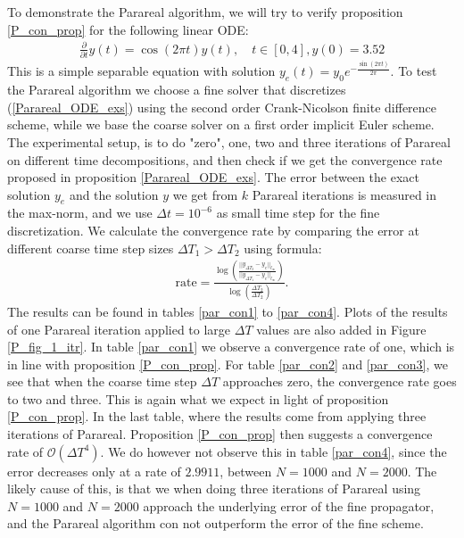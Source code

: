 \\
\\
To demonstrate the Parareal algorithm, we will try to verify proposition \ref{P_con_prop} for the following linear ODE:
\begin{align}
\frac{\partial}{\partial t} y(t) =\cos(2\pi t)y(t), \quad t\in[0,4],y(0)=3.52 \label{Parareal_ODE_exs}
\end{align}
This is a simple separable equation with solution $y_e(t)=y_0e^{-\frac{\sin(2\pi t)}{2\pi}}$. To test the Parareal algorithm we choose a fine solver that discretizes (\ref{Parareal_ODE_exs}) using the second order Crank-Nicolson finite difference scheme\cite{crank1947practical}, while we base the coarse solver on a first order implicit Euler scheme. The experimental setup, is to do "zero", one, two and three iterations of Parareal on different time decompositions, and then check if we get the convergence rate proposed in proposition \ref{Parareal_ODE_exs}. The error between the exact solution $y_e$ and the solution $y$ we get from $k$ Parareal iterations is measured in the max-norm, and we use $\Delta t=10^{-6}$ as small time step for the fine discretization. We calculate the convergence rate by comparing the error at different coarse time step sizes $\Delta T_1>\Delta T_2$ using formula:
\begin{align}
\textrm{rate}=\frac{\log(\frac{||y_{\Delta T_2} -y_e||_{l_{\infty}}}{||y_{\Delta T_1}-y_e||_{l_{\infty}}})}{\log(\frac{\Delta T_2}{ \Delta T_2})}. \label{RateDef}
\end{align} 
The results can be found in tables \ref{par_con1} to \ref{par_con4}. Plots of the results of one Parareal iteration applied to large $\Delta T$ values are also added in Figure \ref{P_fig_1_itr}. In table \ref{par_con1} we observe a convergence rate of one, which is in line with proposition \ref{P_con_prop}. For table \ref{par_con2} and \ref{par_con3}, we see that when the coarse time step $\Delta T$ approaches zero, the convergence rate goes to two and three. This is again what we expect in light of proposition \ref{P_con_prop}. In the last table, where the results come from applying three iterations of Parareal. Proposition \ref{P_con_prop} then suggests a convergence rate of $\mathcal{O}(\Delta T^4)$. We do however not observe this in table \ref{par_con4}, since the error decreases only at a rate of $2.9911$, between $N=1000$ and $N=2000$. The likely cause of this, is that we when doing three iterations of Parareal using $N=1000$ and $N=2000$ approach the underlying error of the fine propagator, and the Parareal algorithm con not outperform the error of the fine scheme.
